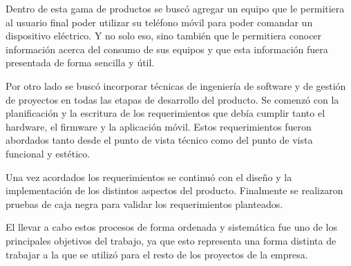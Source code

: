 Dentro de esta gama de productos se buscó agregar un equipo que le permitiera al usuario final poder utilizar su teléfono móvil para poder comandar un dispositivo eléctrico. Y no solo eso, sino también que le permitiera conocer información acerca del consumo de sus equipos y que esta información fuera presentada de forma sencilla y útil.

Por otro lado se buscó incorporar técnicas de ingeniería de software y de gestión de proyectos en todas las etapas de desarrollo del producto. Se  comenzó con la planificación y la escritura de los requerimientos que debía cumplir tanto el hardware, el firmware y la aplicación móvil. Estos requerimientos fueron abordados tanto desde el punto de vista técnico como del punto de vista funcional y estético.

Una vez acordados los requerimientos se continuó con el diseño  y la implementación de los distintos aspectos del producto. Finalmente se realizaron pruebas de caja negra para validar los requerimientos planteados. 

El llevar a cabo estos procesos de forma ordenada y sistemática fue uno de los principales objetivos del trabajo, ya que esto representa una forma distinta de trabajar a la que se utilizó para el resto de los proyectos de la empresa.







